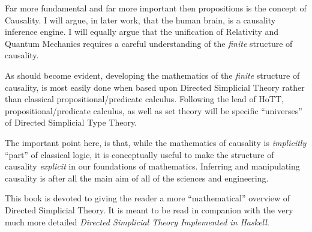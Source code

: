 \documentclass[a4paper,openany]{amsbook}
\begin{document}
Far more fundamental and far more important then propositions is the 
concept of Causality.  I will argue, in later work, that the human 
brain, is a causality inference engine. I will equally argue that the 
unification of Relativity and Quantum Mechanics requires a careful 
understanding of the \emph{finite} structure of causality.

As should become evident, developing the mathematics of the 
\emph{finite} structure of causality, is most easily done when based 
upon Directed Simplicial Theory rather than classical 
propositional/predicate calculus. Following the lead of HoTT, 
propositional/predicate calculus, as well as set theory will be 
specific ``universes'' of Directed Simplicial Type Theory.

The important point here, is that, while the mathematics of causality 
is \emph{implicitly} ``part'' of classical logic, it is conceptually 
useful to make the structure of causality \emph{explicit} in our 
foundations of mathematics.  Inferring and manipulating causality is 
after all the main aim of all of the sciences and engineering.

This book is devoted to giving the reader a more ``mathematical'' 
overview of Directed Simplicial Theory.  It is meant to be read in 
companion with the very much more detailed \textit{Directed Simplicial 
Theory Implemented in Haskell}.



\end{document}
